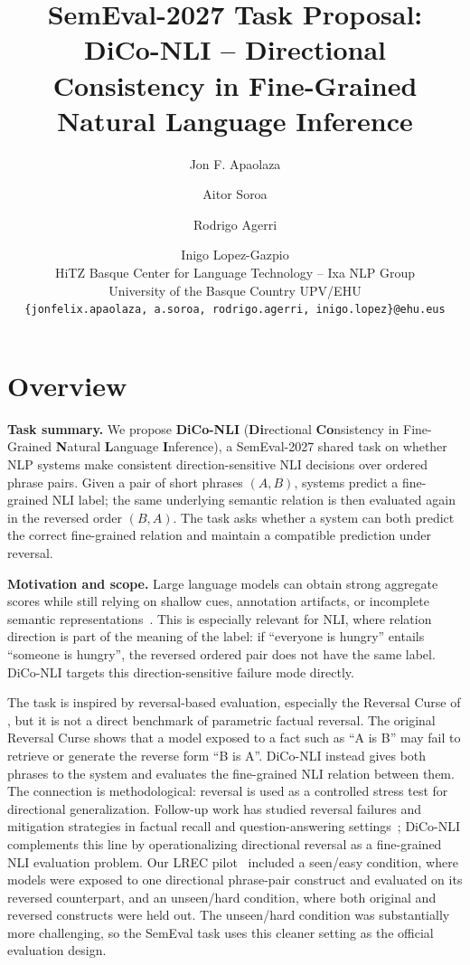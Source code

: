 \documentclass[11pt]{article}
\title{SemEval-2027 Task Proposal: DiCo-NLI -- Directional Consistency in Fine-Grained Natural Language Inference}
\author{
  Jon F. Apaolaza \and Aitor Soroa \and Rodrigo Agerri \and Inigo Lopez-Gazpio \\
  HiTZ Basque Center for Language Technology -- Ixa NLP Group \\
  University of the Basque Country UPV/EHU \\
  \texttt{\{jonfelix.apaolaza, a.soroa, rodrigo.agerri, inigo.lopez\}@ehu.eus}
}
\begin{document}
\maketitle

\section{Overview}

\noindent\textbf{Task summary.}
We propose \textbf{DiCo-NLI} (\textbf{Di}rectional \textbf{Co}nsistency in Fine-Grained \textbf{N}atural \textbf{L}anguage \textbf{I}nference), a SemEval-2027 shared task on whether NLP systems make consistent direction-sensitive NLI decisions over ordered phrase pairs.
Given a pair of short phrases \((A,B)\), systems predict a fine-grained NLI label; the same underlying semantic relation is then evaluated again in the reversed order \((B,A)\).
The task asks whether a system can both predict the correct fine-grained relation and maintain a compatible prediction under reversal.

\medskip
\noindent\textbf{Motivation and scope.}
Large language models can obtain strong aggregate scores while still relying on shallow cues, annotation artifacts, or incomplete semantic representations~\cite{gururangan2018annotation,lopez2024revisiting}.
This is especially relevant for NLI, where relation direction is part of the meaning of the label: if ``everyone is hungry'' entails ``someone is hungry'', the reversed ordered pair does not have the same label.
DiCo-NLI targets this direction-sensitive failure mode directly.

The task is inspired by reversal-based evaluation, especially the Reversal Curse of \citet{berglund2023reversal}, but it is not a direct benchmark of parametric factual reversal.
The original Reversal Curse shows that a model exposed to a fact such as ``A is B'' may fail to retrieve or generate the reverse form ``B is A''.
DiCo-NLI instead gives both phrases to the system and evaluates the fine-grained NLI relation between them.
The connection is methodological: reversal is used as a controlled stress test for directional generalization.
Follow-up work has studied reversal failures and mitigation strategies in factual recall and question-answering settings~\cite{golovneva2024reverse,lin2024delving}; DiCo-NLI complements this line by operationalizing directional reversal as a fine-grained NLI evaluation problem.
Our LREC pilot~\cite{apaolaza-etal-2026-assessing} included a seen/easy condition, where models were exposed to one directional phrase-pair construct and evaluated on its reversed counterpart, and an unseen/hard condition, where both original and reversed constructs were held out.
The unseen/hard condition was substantially more challenging, so the SemEval task uses this cleaner setting as the official evaluation design.
\end{document}
